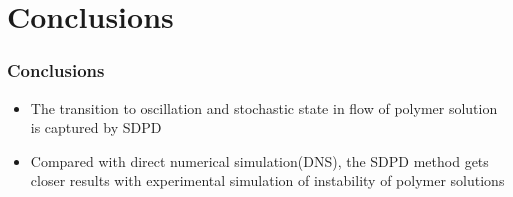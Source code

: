\section{Conclusions}
\begin{frame}
  \frametitle{Conclusions}
  \begin{itemize}
  \item The transition to oscillation and stochastic state in flow of polymer solution is captured by SDPD
  \item Compared with direct numerical simulation(DNS),
the SDPD method gets closer results with experimental simulation of instability of polymer solutions
  \end{itemize}
\end{frame}
